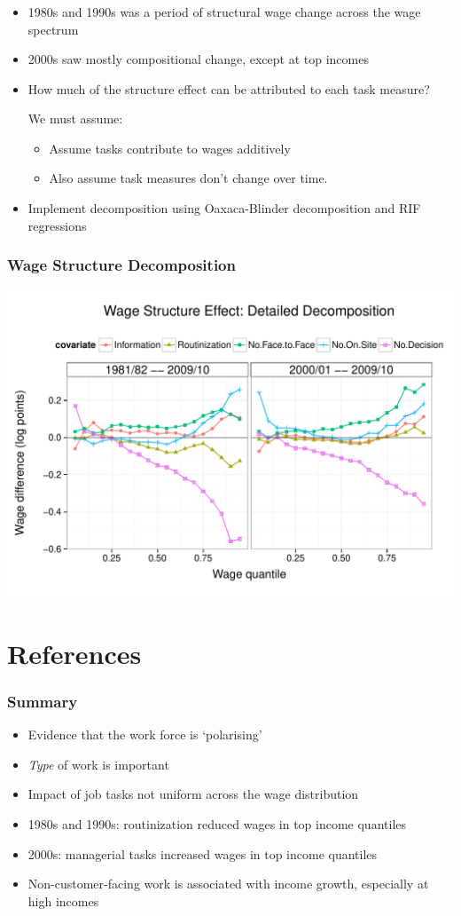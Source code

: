 \documentclass[red]{beamer}
\newcommand{\vitem}{\vfill\item}
\begin{document}
\begin{frame}[c]
  \frametitle{}
  \begin{itemize}
  \vitem 1980s and 1990s was a period of structural wage change across the wage spectrum
  \vitem 2000s saw mostly compositional change, except at top incomes
  \pause
  \vitem How much of the structure effect can be attributed to each task measure?

  We must assume:
  \begin{itemize}
  \vitem Assume tasks contribute to wages additively
  \vitem Also assume task measures don't change over time.
  \end{itemize}
  \vitem Implement decomposition using Oaxaca-Blinder decomposition and RIF regressions
\end{itemize}
\end{frame}

\begin{frame}[c]
  \frametitle{Wage Structure Decomposition}
  \includegraphics[width=\textwidth]{../figure/structure_decomp.pdf}
\end{frame}

\section*{References}

\begin{frame}
  \frametitle{Summary}
  \begin{itemize}
  \vitem Evidence that the work force is `polarising'
  \vitem {\em Type} of work is important
  \vitem Impact of job tasks not uniform across the wage distribution
  \vitem 1980s and 1990s: routinization reduced wages in top income quantiles
  \vitem 2000s: managerial tasks increased wages in top income quantiles
  \vitem Non-customer-facing work is associated with income growth, especially at high incomes
  \end{itemize}
\end{frame}
\end{document}
